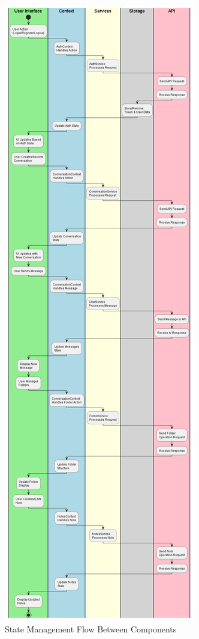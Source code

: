 \begin{figure}[p]
    \centering
    \includegraphics[width=\textwidth,height=0.8\textheight,keepaspectratio]{./Chapter07/figures/state_management_flow.png}
    \caption{State Management Flow Between Components}
    \label{fig:state-management-flow}
\end{figure}
\clearpage

